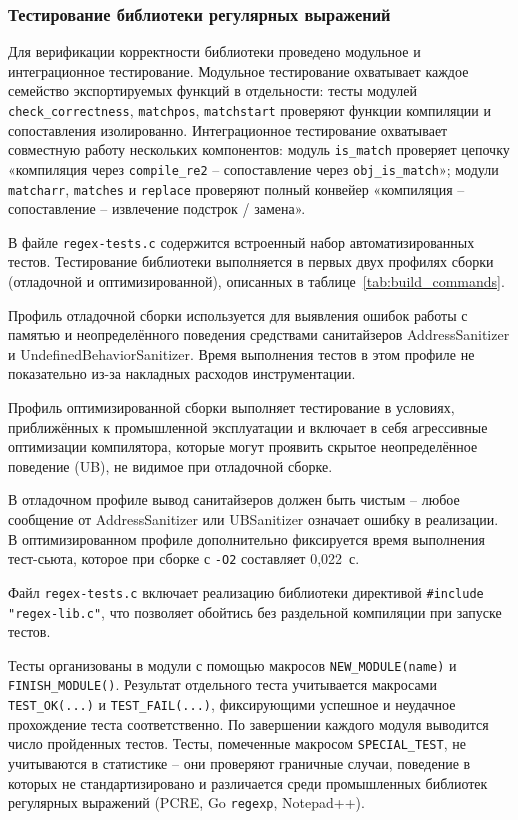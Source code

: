 \subsubsection{Тестирование библиотеки регулярных выражений}

Для верификации корректности библиотеки проведено модульное и интеграционное тестирование. Модульное тестирование охватывает каждое семейство экспортируемых функций в отдельности: тесты модулей \verb`check_correctness`, \verb`matchpos`, \verb`matchstart` проверяют функции компиляции и сопоставления изолированно. Интеграционное тестирование охватывает совместную работу нескольких компонентов: модуль \verb`is_match` проверяет цепочку «компиляция через \verb`compile_re2` -- сопоставление через \verb`obj_is_match`»; модули \verb`matcharr`, \verb`matches` и \verb`replace` проверяют полный конвейер «компиляция -- сопоставление -- извлечение подстрок / замена».

В файле \verb`regex-tests.c` содержится встроенный набор автоматизированных тестов. Тестирование библиотеки выполняется в первых двух профилях сборки (отладочной и оптимизированной), описанных в таблице~\ref{tab:build_commands}.

Профиль отладочной сборки используется для выявления ошибок работы с памятью и неопределённого поведения средствами санитайзеров AddressSanitizer и UndefinedBehaviorSanitizer. Время выполнения тестов в этом профиле не показательно из-за накладных расходов инструментации.

Профиль оптимизированной сборки выполняет тестирование в условиях, приближённых к промышленной эксплуатации и включает в себя агрессивные оптимизации компилятора, которые могут проявить скрытое неопределённое поведение (UB), не видимое при отладочной сборке.

В отладочном профиле вывод санитайзеров должен быть чистым -- любое
сообщение от AddressSanitizer или UBSanitizer означает ошибку в реализации.
В оптимизированном профиле дополнительно фиксируется время выполнения
тест-сьюта, которое при сборке с \verb`-O2` составляет 0,022~с.

Файл \verb`regex-tests.c` включает реализацию библиотеки директивой \verb`#include "regex-lib.c"`, что позволяет обойтись без раздельной компиляции при запуске тестов.

Тесты организованы в модули с помощью макросов \verb`NEW_MODULE(name)` и \verb`FINISH_MODULE()`. Результат отдельного теста учитывается макросами \verb`TEST_OK(...)` и \verb`TEST_FAIL(...)`, фиксирующими успешное и неудачное прохождение теста соответственно. По завершении каждого модуля выводится число пройденных тестов. Тесты, помеченные макросом \verb`SPECIAL_TEST`, не учитываются в статистике -- они проверяют граничные случаи, поведение в которых не стандартизировано и различается среди промышленных библиотек регулярных выражений (PCRE, Go \verb`regexp`, Notepad++).

